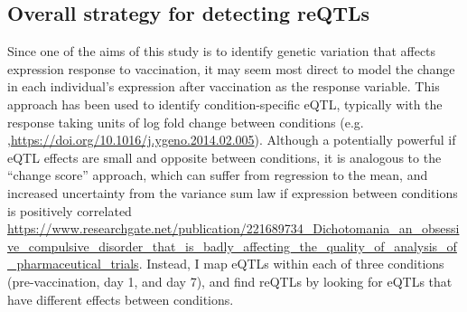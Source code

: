 \subsection{Overall strategy for detecting reQTLs}

Since one of the aims of this study is to identify genetic variation that affects expression response to vaccination, it may seem most direct to model the change in each individual's expression after vaccination as the response variable.
This approach has been used to identify condition-specific \gls{eQTL}, typically with the response taking units of log fold change between conditions (e.g. \autocite{maranville2011InteractionsGlucocorticoidTreatment,ackermann2013ImpactNaturalGenetic},\url{https://doi.org/10.1016/j.ygeno.2014.02.005}).
Although a potentially powerful if \gls{eQTL} effects are small and opposite between conditions\autocite{ackermann2013ImpactNaturalGenetic}, it is analogous to the \enquote{change score} approach, which can suffer from regression to the mean, and increased uncertainty from the variance sum law if expression between conditions is positively correlated\autocite{allison1990ChangeScoresDependent,ackermann2013ImpactNaturalGenetic,clifton2019CorrelationBaselineScore} \url{https://www.researchgate.net/publication/221689734_Dichotomania_an_obsessive_compulsive_disorder_that_is_badly_affecting_the_quality_of_analysis_of_pharmaceutical_trials}.
Instead, I map \glspl{eQTL} within each of three conditions (pre-vaccination, day 1, and day 7), and find \glspl{reQTL} by looking for \glspl{eQTL} that have different effects between conditions.

